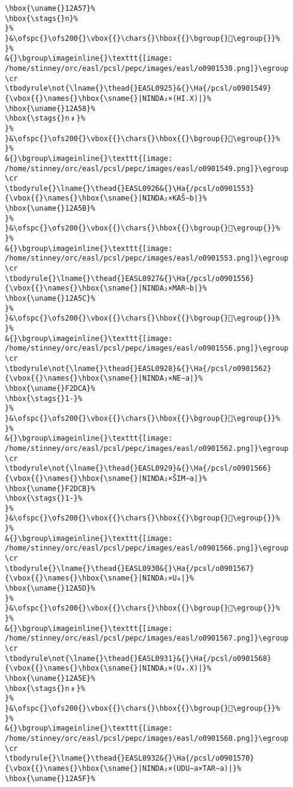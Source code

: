\begin{verbatim}
\hbox{\uname{}12A57}%
\hbox{\stags{}n}%
}%
}&\ofspc{}\ofs200{}\vbox{{}\chars{}\hbox{{}\bgroup{}𒩗\egroup{}}%
}%
&{}\bgroup\imageinline{}\texttt{[image: /home/stinney/orc/easl/pcsl/pepc/images/easl/o0901530.png]}\egroup
\cr
\tbodyrule\not{\lname{}\thead{}EASL0925}&{}\Ha{/pcsl/o0901549}{\vbox{{}\names{}\hbox{\sname{}|NINDA₂×(HI.X)|}%
\hbox{\uname{}12A58}%
\hbox{\stags{}n﹟}%
}%
}&\ofspc{}\ofs200{}\vbox{{}\chars{}\hbox{{}\bgroup{}𒩘\egroup{}}%
}%
&{}\bgroup\imageinline{}\texttt{[image: /home/stinney/orc/easl/pcsl/pepc/images/easl/o0901549.png]}\egroup
\cr
\tbodyrule{}\lname{}\thead{}EASL0926&{}\Ha{/pcsl/o0901553}{\vbox{{}\names{}\hbox{\sname{}|NINDA₂×KAŠ∼b|}%
\hbox{\uname{}12A5B}%
}%
}&\ofspc{}\ofs200{}\vbox{{}\chars{}\hbox{{}\bgroup{}𒩛\egroup{}}%
}%
&{}\bgroup\imageinline{}\texttt{[image: /home/stinney/orc/easl/pcsl/pepc/images/easl/o0901553.png]}\egroup
\cr
\tbodyrule{}\lname{}\thead{}EASL0927&{}\Ha{/pcsl/o0901556}{\vbox{{}\names{}\hbox{\sname{}|NINDA₂×MAR∼b|}%
\hbox{\uname{}12A5C}%
}%
}&\ofspc{}\ofs200{}\vbox{{}\chars{}\hbox{{}\bgroup{}𒩜\egroup{}}%
}%
&{}\bgroup\imageinline{}\texttt{[image: /home/stinney/orc/easl/pcsl/pepc/images/easl/o0901556.png]}\egroup
\cr
\tbodyrule\not{\lname{}\thead{}EASL0928}&{}\Ha{/pcsl/o0901562}{\vbox{{}\names{}\hbox{\sname{}|NINDA₂×NE∼a|}%
\hbox{\uname{}F2DCA}%
\hbox{\stags{}1-}%
}%
}&\ofspc{}\ofs200{}\vbox{{}\chars{}\hbox{{}\bgroup{}󲷊\egroup{}}%
}%
&{}\bgroup\imageinline{}\texttt{[image: /home/stinney/orc/easl/pcsl/pepc/images/easl/o0901562.png]}\egroup
\cr
\tbodyrule\not{\lname{}\thead{}EASL0929}&{}\Ha{/pcsl/o0901566}{\vbox{{}\names{}\hbox{\sname{}|NINDA₂×ŠIM∼a|}%
\hbox{\uname{}F2DCB}%
\hbox{\stags{}1-}%
}%
}&\ofspc{}\ofs200{}\vbox{{}\chars{}\hbox{{}\bgroup{}󲷋\egroup{}}%
}%
&{}\bgroup\imageinline{}\texttt{[image: /home/stinney/orc/easl/pcsl/pepc/images/easl/o0901566.png]}\egroup
\cr
\tbodyrule{}\lname{}\thead{}EASL0930&{}\Ha{/pcsl/o0901567}{\vbox{{}\names{}\hbox{\sname{}|NINDA₂×U₄|}%
\hbox{\uname{}12A5D}%
}%
}&\ofspc{}\ofs200{}\vbox{{}\chars{}\hbox{{}\bgroup{}𒩝\egroup{}}%
}%
&{}\bgroup\imageinline{}\texttt{[image: /home/stinney/orc/easl/pcsl/pepc/images/easl/o0901567.png]}\egroup
\cr
\tbodyrule\not{\lname{}\thead{}EASL0931}&{}\Ha{/pcsl/o0901568}{\vbox{{}\names{}\hbox{\sname{}|NINDA₂×(U₄.X)|}%
\hbox{\uname{}12A5E}%
\hbox{\stags{}n﹟}%
}%
}&\ofspc{}\ofs200{}\vbox{{}\chars{}\hbox{{}\bgroup{}𒩞\egroup{}}%
}%
&{}\bgroup\imageinline{}\texttt{[image: /home/stinney/orc/easl/pcsl/pepc/images/easl/o0901568.png]}\egroup
\cr
\tbodyrule{}\lname{}\thead{}EASL0932&{}\Ha{/pcsl/o0901570}{\vbox{{}\names{}\hbox{\sname{}|NINDA₂×(UDU∼a×TAR∼a)|}%
\hbox{\uname{}12A5F}%

\end{verbatim}
